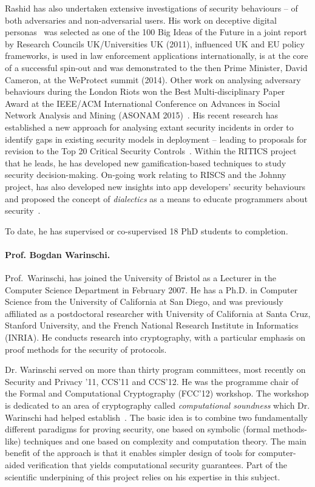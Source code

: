 \documentclass[10pt]{article}
\begin{document}
Rashid has also undertaken extensive investigations of security behaviours -- of both adversaries and non-adversarial users.
His work on deceptive digital personas~\cite{rashid2013} was selected as one of the 100 Big Ideas of the Future in a joint report by Research Councils UK/Universities UK (2011), influenced UK and EU policy frameworks, is used in law enforcement applications internationally, is at the core of a successful spin-out and was demonstrated to the then Prime Minister, David Cameron, at the WeProtect summit (2014). Other work on analysing adversary behaviours during the London Riots won the Best Multi-disciplinary Paper Award at the IEEE/ACM International Conference on Advances in Social Network Analysis and Mining (ASONAM 2015)~\cite{charitonidis2015}. His recent research has established a new approach for analysing extant security incidents in order to identify gaps in existing security models in deployment -- leading to proposals for revision to the Top 20 Critical Security Controls~\cite{rashid2016}. Within the RITICS project that he leads, he has developed new gamification-based techniques to study security decision-making. On-going work relating to RISCS and the Johnny project, has also developed new insights into app developers' security behaviours~\cite{weir2016} and proposed the concept of \textit{dialectics} as a means to educate programmers about security~\cite{weir2017}.  

To date, he has supervised or co-supervised 18 PhD students to completion.


\paragraph{Prof. Bogdan Warinschi.}
Prof.~Warinschi, has joined the University of 
Bristol as a Lecturer in the Computer Science Department in February 2007. 
He has a Ph.D. in Computer Science from the University of California
at San Diego, and was previously affiliated as a postdoctoral researcher with
University of California at Santa Cruz, Stanford University, and the
French National Research Institute in Informatics (INRIA).
He conducts research into cryptography, with a particular emphasis on
proof methods for the security of protocols.


Dr. Warinschi served on more than thirty program committees, most recently on Security and Privacy '11, CCS'11 and CCS'12. 
He was the programme chair of the Formal and Computational Cryptography (FCC'12) workshop. 
The workshop is dedicated to an area of cryptography called {\em computational   soundness} which Dr. Warinschi had helped establish~\cite{micciancio04soundness,cortier05computationally}.
The basic idea is to combine two fundamentally different paradigms for proving security, one based on symbolic (formal methods-like) techniques and one based on complexity and computation theory. The main benefit of the approach is that it enables simpler design of tools for computer-aided verification that yields computational security guarantees.
Part of the scientific underpining of this project relies on his expertise in this subject. 
\end{document}
